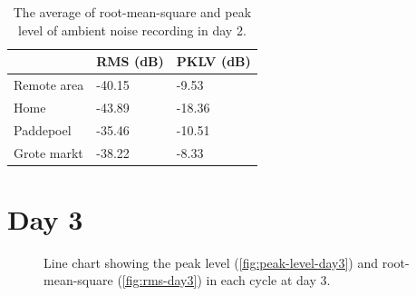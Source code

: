 \begin{table}[H]
\centering
\caption{The average of root-mean-square and peak level of ambient noise recording in day 2.}
\label{tab:ambient-noise-average-day2}
\begin{tabular}{lll} \toprule
            & \ac{RMS} (dB) & \ac{PKLV} (dB) \\ \midrule
Remote area & -40.15                & -9.53          \\
Home        & -43.89                & -18.36           \\
Paddepoel   & -35.46                & -10.51          \\
Grote markt & -38.22              & -8.33        \\ \bottomrule
\end{tabular}
\end{table}





\section{Day 3} %
\label{sec:ambient-noise-day_3}
\begin{figure}[H]
	\centering
	\caption{Line chart showing the peak level (\ref{fig:peak-level-day3}) and root-mean-square (\ref{fig:rms-day3}) in each cycle at day 3.}
	\label{fig:audio-result-day3}
\end{figure}

